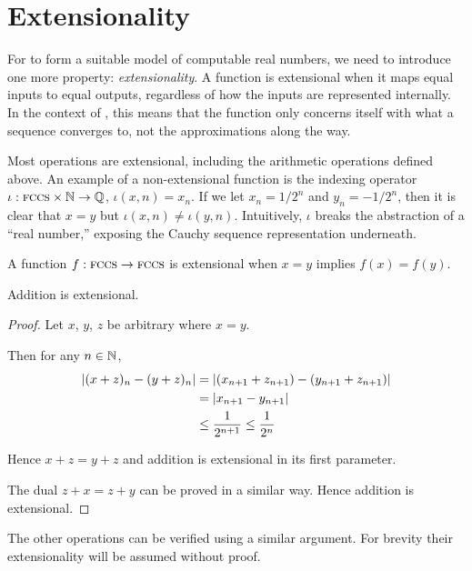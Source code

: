 \documentclass[leqno]{report}
\begin{document}
\section{Extensionality}

For \FCCS{} to form a suitable model of computable real numbers, we need to introduce one more property: \textit{extensionality}. A function is extensional when it maps equal inputs to equal outputs, regardless of how the inputs are represented internally. In the context of \FCCS, this means that the function only concerns itself with what a sequence converges to, not the approximations along the way.

Most operations are extensional, including the arithmetic operations defined above. An example of a non-extensional function is the indexing operator $\iota : \textsc{fccs} \times \mathbb{N} \rightarrow \mathbb{Q}$, $\iota(x, n) = x_n$. If we let $x_n = 1/2^n$ and $y_n = -1/2^n$, then it is clear that $x = y$ but $\iota(x, n) \neq \iota(y, n)$. Intuitively, $\iota$ breaks the abstraction of a ``real number,'' exposing the Cauchy sequence representation underneath.

\begin{Definition}[Extensionality]
    A function $f : \textsc{fccs} \rightarrow \textsc{fccs}$ is extensional when $x = y$ implies $f(x) = f(y)$.
\end{Definition}

\begin{Proposition}
    Addition is extensional.
\end{Proposition}

\begin{proof}
    Let $x$, $y$, $z$ be arbitrary \FCCS{} where $x = y$.

    Then for any $n \in \mathbb{N}$,
    \begin{align*}
        \left|  (x + z)_n - (y + z)_n  \right|
        &= \left|  (x_{n+1} + z_{n+1}) - (y_{n+1} + z_{n+1})  \right| \\
        &= \left|  x_{n+1} - y_{n+1}  \right| \\
        &\leq \frac{1}{2^{n+1}} \leq \frac{1}{2^n}
    \end{align*}

    Hence $x + z = y + z$ and addition is extensional in its first parameter.

    The dual $z + x = z + y$ can be proved in a similar way. Hence addition is extensional.
\end{proof}

The other operations can be verified using a similar argument. For brevity their extensionality will be assumed without proof.
\end{document}
